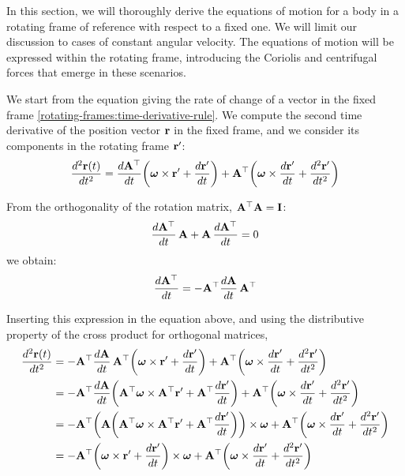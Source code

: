\documentclass[12pt]{article}
\begin{document}
In this section, we will thoroughly derive the equations of motion for a body in a rotating
frame of reference with respect to a fixed one. We will limit our discussion to cases of
constant angular velocity. The equations of motion will be expressed within the rotating
frame, introducing the Coriolis and centrifugal forces that emerge in these scenarios.

We start from the equation giving the rate of change of a vector in the fixed frame
\eqref{rotating-frames:time-derivative-rule}. We compute the second time derivative of the position vector
$\vb{r}$ in the fixed frame, and we consider its components in the rotating frame $\vb{r}'$:
\begin{equation}
  \frac{d^2\vb{r}(t)}{dt^2} =
    \frac{d\vb{A}^\top}{dt}\!\left(\boldsymbol{\omega}\times\vb{r}' + \frac{d\vb{r}'}{dt}\right)
    + \vb{A}^\top\!\left(\boldsymbol{\omega}\times\frac{d\vb{r}'}{dt} + \frac{d^2\vb{r}'}{dt^2}\right)
\end{equation}

From the orthogonality of the rotation matrix, $\vb{A}^\top\vb{A} = \vb{I}$:
\begin{equation}
  \frac{d\vb{A}^\top}{dt}\,\vb{A} + \vb{A}\,\frac{d\vb{A}^\top}{dt} = 0
\end{equation}
we obtain:
\begin{equation}
  \frac{d\vb{A}^\top}{dt} = -\vb{A}^\top\frac{d\vb{A}}{dt}\,\vb{A}^\top
\end{equation}

Inserting this expression in the equation above, and using the distributive property of the
cross product for orthogonal matrices,
\begin{equation}
  \begin{aligned}
    \frac{d^2\vb{r}(t)}{dt^2}
    &= -\vb{A}^\top\frac{d\vb{A}}{dt}\,\vb{A}^\top
       \!\left(\boldsymbol{\omega}\times\vb{r}' + \frac{d\vb{r}'}{dt}\right)
       + \vb{A}^\top\!\left(\boldsymbol{\omega}\times\frac{d\vb{r}'}{dt} + \frac{d^2\vb{r}'}{dt^2}\right) \\
    &= -\vb{A}^\top\frac{d\vb{A}}{dt}
       \!\left(\vb{A}^\top\boldsymbol{\omega}\times\vb{A}^\top\vb{r}'
         + \vb{A}^\top\frac{d\vb{r}'}{dt}\right)
       + \vb{A}^\top\!\left(\boldsymbol{\omega}\times\frac{d\vb{r}'}{dt} + \frac{d^2\vb{r}'}{dt^2}\right) \\
    &= -\vb{A}^\top\!\left(\vb{A}\!\left(\vb{A}^\top\boldsymbol{\omega}\times\vb{A}^\top\vb{r}'
         + \vb{A}^\top\frac{d\vb{r}'}{dt}\right)\right)\times\boldsymbol{\omega}
       + \vb{A}^\top\!\left(\boldsymbol{\omega}\times\frac{d\vb{r}'}{dt} + \frac{d^2\vb{r}'}{dt^2}\right) \\
    &= -\vb{A}^\top\!\left(\boldsymbol{\omega}\times\vb{r}' + \frac{d\vb{r}'}{dt}\right)\times\boldsymbol{\omega}
       + \vb{A}^\top\!\left(\boldsymbol{\omega}\times\frac{d\vb{r}'}{dt} + \frac{d^2\vb{r}'}{dt^2}\right)
  \end{aligned}
\end{equation}
\end{document}
